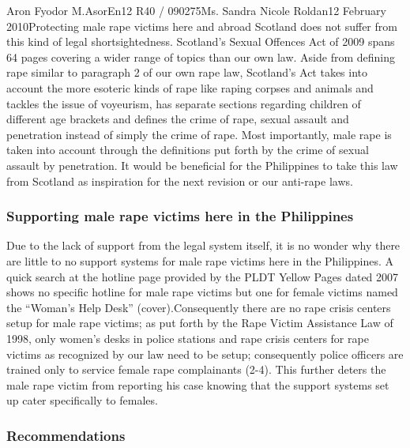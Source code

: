 \documentclass[12pt,letterpaper]{article}
\begin{document}
\begin{mla}{Aron Fyodor M.}{Asor}{En12 R40 / 090275}{Ms. Sandra Nicole Roldan}{12 February 2010}{Protecting male rape victims here and abroad}
%
%
Scotland does not suffer from this kind of legal shortsightedness. Scotland's Sexual Offences Act of 2009 spans 64 pages covering a wider range of topics than our own law. Aside from defining rape similar to paragraph 2 of our own rape law, Scotland's Act takes into account the more esoteric kinds of rape like raping corpses and animals and tackles the issue of voyeurism, has separate sections regarding children of different age brackets and defines the crime of rape, sexual assault and penetration instead of simply the crime of rape. Most importantly, male rape is taken into account through the definitions put forth by the crime of sexual assault by penetration. It would be beneficial for the Philippines to take this law from Scotland as inspiration for the next revision or our anti-rape laws.

%
%
\subsubsection{Supporting male rape victims here in the Philippines}
Due to the lack of support from the legal system itself, it is no wonder why there are little to no support systems for male rape victims here in the Philippines. A quick search at the hotline page provided by the PLDT Yellow Pages dated 2007 shows no specific hotline for male rape victims but one for female victims named the ``Woman's Help Desk'' (cover).Consequently there are no rape crisis centers setup for male rape victims; as put forth by the Rape Victim Assistance Law of 1998, only women's desks in police stations and rape crisis centers for rape victims as recognized by our law need to be setup; consequently police officers are trained only to service female rape complainants (2-4). This further deters the male rape victim from reporting his case knowing that the support systems set up cater specifically to females.

%
%
\subsubsection{Recommendations}


\end{mla}
\end{document}
